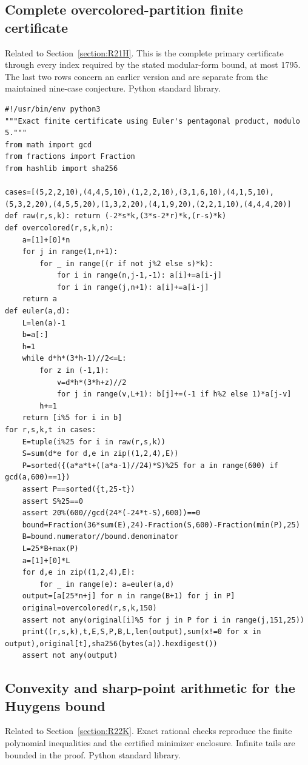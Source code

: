 \documentclass[11pt,a4paper]{article}
\begin{document}
\subsection{Complete overcolored-partition finite certificate}
\noindent Related to Section~\ref{section:R21H}. This is the complete primary certificate through every index required by the stated modular-form bound, at most 1795. The last two rows concern an earlier version and are separate from the maintained nine-case conjecture. Python standard library.

\begin{Verbatim}[fontsize=\scriptsize,breaklines,breakanywhere]
#!/usr/bin/env python3
"""Exact finite certificate using Euler's pentagonal product, modulo 5."""
from math import gcd
from fractions import Fraction
from hashlib import sha256

cases=[(5,2,2,10),(4,4,5,10),(1,2,2,10),(3,1,6,10),(4,1,5,10),(5,3,2,20),(4,5,5,20),(1,3,2,20),(4,1,9,20),(2,2,1,10),(4,4,4,20)]
def raw(r,s,k): return (-2*s*k,(3*s-2*r)*k,(r-s)*k)
def overcolored(r,s,k,n):
    a=[1]+[0]*n
    for j in range(1,n+1):
        for _ in range((r if not j%2 else s)*k):
            for i in range(n,j-1,-1): a[i]+=a[i-j]
            for i in range(j,n+1): a[i]+=a[i-j]
    return a
def euler(a,d):
    L=len(a)-1
    b=a[:]
    h=1
    while d*h*(3*h-1)//2<=L:
        for z in (-1,1):
            v=d*h*(3*h+z)//2
            for j in range(v,L+1): b[j]+=(-1 if h%2 else 1)*a[j-v]
        h+=1
    return [i%5 for i in b]
for r,s,k,t in cases:
    E=tuple(i%25 for i in raw(r,s,k))
    S=sum(d*e for d,e in zip((1,2,4),E))
    P=sorted({(a*a*t+((a*a-1)//24)*S)%25 for a in range(600) if gcd(a,600)==1})
    assert P==sorted({t,25-t})
    assert S%25==0
    assert 20%(600//gcd(24*(-24*t-S),600))==0
    bound=Fraction(36*sum(E),24)-Fraction(S,600)-Fraction(min(P),25)
    B=bound.numerator//bound.denominator
    L=25*B+max(P)
    a=[1]+[0]*L
    for d,e in zip((1,2,4),E):
        for _ in range(e): a=euler(a,d)
    output=[a[25*n+j] for n in range(B+1) for j in P]
    original=overcolored(r,s,k,150)
    assert not any(original[i]%5 for j in P for i in range(j,151,25))
    print((r,s,k),t,E,S,P,B,L,len(output),sum(x!=0 for x in output),original[t],sha256(bytes(a)).hexdigest())
    assert not any(output)
\end{Verbatim}
\subsection{Convexity and sharp-point arithmetic for the Huygens bound}
\noindent Related to Section~\ref{section:R22K}. Exact rational checks reproduce the finite polynomial inequalities and the certified minimizer enclosure. Infinite tails are bounded in the proof. Python standard library.
\end{document}
